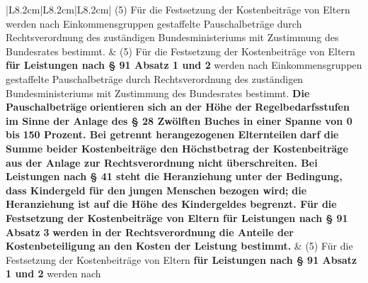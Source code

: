 \documentclass[10pt,a4paper,landscape]{article}
\begin{document}
\begin{longtable}{|L{8.2cm}|L{8.2cm}|L{8.2cm}|}
(5) Für die Festsetzung der Kostenbeiträge  \newline von Eltern werden nach  \newline Einkommensgruppen gestaffelte  \newline Pauschalbeträge durch Rechtsverordnung  \newline des zuständigen Bundesministeriums mit  \newline Zustimmung des Bundesrates bestimmt. & (5) Für die Festsetzung der Kostenbeiträge  \newline von Eltern \textbf{für Leistungen nach \S{} 91  \newline Absatz 1 und 2} werden nach  \newline Einkommensgruppen gestaffelte  \newline Pauschalbeträge durch Rechtsverordnung  \newline des zuständigen Bundesministeriums mit  \newline Zustimmung des Bundesrates bestimmt.  \newline \textbf{\textcolor{diffred}{Die Pauschalbeträge}}\textbf{ orientieren sich an} \newline \textbf{\textcolor{diffred}{der Höhe der}}\textbf{ Regelbedarfsstufen im  \newline Sinne der Anlage des \S{} 28 Zwölften  \newline Buches in einer Spanne von 0 bis }\textbf{\textcolor{diffred}{150  \newline Prozent. Bei getrennt herangezogenen  \newline Elternteilen}}\textbf{ darf die Summe beider  \newline Kostenbeiträge den Höchstbetrag der  \newline Kostenbeiträge aus der Anlage zur  \newline Rechtsverordnung nicht überschreiten.  \newline Bei Leistungen nach \S{} 41 steht die  \newline Heranziehung unter der Bedingung,  \newline dass Kindergeld für den jungen  \newline Menschen }\textbf{\textcolor{diffred}{bezogen wird;}}\textbf{ die  \newline Heranziehung ist auf die Höhe des  \newline Kindergeldes begrenzt. Für die  \newline Festsetzung der Kostenbeiträge von  \newline Eltern für Leistungen nach \S{} 91 Absatz }\textbf{\textcolor{diffred}{3}}\textbf{  \newline werden in der Rechtsverordnung die  \newline Anteile der }\textbf{\textcolor{diffred}{Kostenbeteiligung}}\textbf{ an den  \newline Kosten der Leistung bestimmt.} & (5) Für die Festsetzung der Kostenbeiträge  \newline von Eltern \textbf{für Leistungen nach \S{} 91  \newline Absatz 1 und 2} werden nach  \newline 
\end{longtable}
\end{document}
